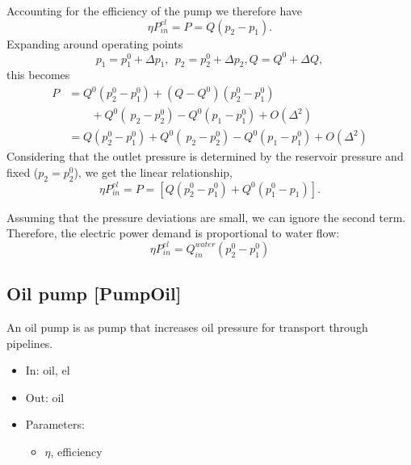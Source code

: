 \documentclass[12pt]{article}
\begin{document}
Accounting for the efficiency of the pump we therefore have
 \begin{equation} 
 	\eta P_{in}^{el}=P=Q \left( p_{2}-p_{1} \right) . 
 \end{equation}
%
Expanding around operating points  
\begin{equation}
 p_{1}=p_{1}^{0}+ \Delta p_{1},~~p_{2}=p_{2}^{0}+ \Delta p_{2}, Q=Q^{0}+ \Delta Q, 
 \end{equation} 
 this becomes
%
\begin{equation}
 \begin{split}
 P &=Q^{0} \left( p_{2}^{0}-p_{1}^{0} \right) 
 		+ \left( Q-Q^{0} \right)  \left( p_{2}^{0}-p_{1}^{0} \right) 
	\\& \qquad
 		+Q^{0} \left( ~p_{2}-p_{2}^{0} \right) 
 		-Q^{0} \left( p_{1}-p_{1}^{0} \right) 
 		+O \left(  \Delta ^{2} \right)  
	\\ &
	=Q \left( p_{2}^{0}-p_{1}^{0} \right) +Q^{0} \left( ~p_{2}-p_{2}^{0} \right) 
		-Q^{0} \left( p_{1}-p_{1}^{0} \right) 
		+O \left(  \Delta ^{2} \right)  
 \end{split}
 \end{equation}
%
Considering that the outlet pressure is determined by the reservoir pressure and fixed ($p_{2}=p_{2}^{0}$), we get the linear relationship,
 \begin{equation} 
 \eta P_{in}^{el}= P
 	= \left[ Q \left( p_{2}^{0}-p_{1}^{0} \right) +Q^{0} \left( p_{1}^{0}-p_{1} \right)  \right].  
 \end{equation}


Assuming that the pressure deviations are small, we can ignore the second term. Therefore, the electric power demand is proportional to water flow:
 \begin{equation}
 \eta P_{in}^{el}=Q_{in}^{water} \left( p_{2}^{0}-p_{1}^{0} \right)  
 \end{equation}



\subsection{Oil pump [PumpOil]}
An oil pump is as pump that increases oil pressure for transport through pipelines.

\begin{itemize}
\item In: oil, el
\item Out: oil
\item Parameters:
\begin{itemize}[noitemsep,topsep=0pt]
	\item $\eta$,  efficiency
\end{itemize}
\end{itemize}
\end{document}
